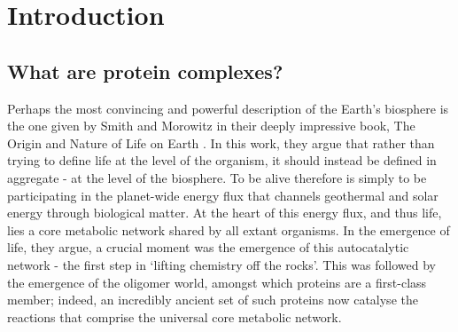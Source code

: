 \documentclass[a4paper,11pt,twoside,openright]{scrbook}
\begin{document}
\chapter{Introduction}

\section{What are protein complexes?}


Perhaps the most convincing and powerful description of the Earth's biosphere is the one given by Smith and Morowitz in their deeply impressive book, The Origin and Nature of Life on Earth \cite{Smith2016}. In this work, they argue that rather than trying to define life at the level of the organism, it should instead be defined in aggregate - at the level of the biosphere. To be alive therefore is simply to be participating in the planet-wide energy flux that channels geothermal and solar energy through biological matter. At the heart of this energy flux, and thus life, lies a core metabolic network shared by all extant organisms. In the emergence of life, they argue, a crucial moment was the emergence of this autocatalytic network - the first step in `lifting chemistry off the rocks'. This was followed by the emergence of the oligomer world, amongst which proteins are a first-class member; indeed, an incredibly ancient set of such proteins now catalyse the reactions that comprise the universal core metabolic network.

\end{document}
